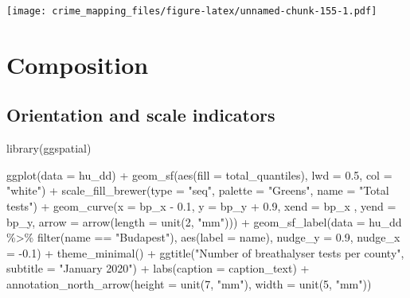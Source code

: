 \documentclass[
]{book}
\newenvironment{Shaded}{\begin{snugshade}}{\end{snugshade}}
\newcommand{\AttributeTok}[1]{\textcolor[rgb]{0.77,0.63,0.00}{#1}}
\newcommand{\DecValTok}[1]{\textcolor[rgb]{0.00,0.00,0.81}{#1}}
\newcommand{\FloatTok}[1]{\textcolor[rgb]{0.00,0.00,0.81}{#1}}
\newcommand{\FunctionTok}[1]{\textcolor[rgb]{0.00,0.00,0.00}{#1}}
\newcommand{\NormalTok}[1]{#1}
\newcommand{\SpecialCharTok}[1]{\textcolor[rgb]{0.00,0.00,0.00}{#1}}
\newcommand{\StringTok}[1]{\textcolor[rgb]{0.31,0.60,0.02}{#1}}
\begin{document}
\texttt{[image: crime\_mapping\_files/figure-latex/unnamed-chunk-155-1.pdf]}

\hypertarget{composition}{%
\section{Composition}\label{composition}}

\hypertarget{orientation-and-scale-indicators}{%
\subsection{Orientation and scale indicators}\label{orientation-and-scale-indicators}}

\begin{Shaded}
\begin{Highlighting}[]
\FunctionTok{library}\NormalTok{(ggspatial)}

\FunctionTok{ggplot}\NormalTok{(}\AttributeTok{data =}\NormalTok{ hu\_dd) }\SpecialCharTok{+} 
  \FunctionTok{geom\_sf}\NormalTok{(}\FunctionTok{aes}\NormalTok{(}\AttributeTok{fill =}\NormalTok{ total\_quantiles), }\AttributeTok{lwd =} \FloatTok{0.5}\NormalTok{, }\AttributeTok{col =} \StringTok{"white"}\NormalTok{) }\SpecialCharTok{+} 
  \FunctionTok{scale\_fill\_brewer}\NormalTok{(}\AttributeTok{type =} \StringTok{"seq"}\NormalTok{, }\AttributeTok{palette =} \StringTok{"Greens"}\NormalTok{, }\AttributeTok{name =} \StringTok{"Total tests"}\NormalTok{) }\SpecialCharTok{+} 
  \FunctionTok{geom\_curve}\NormalTok{(}\AttributeTok{x =}\NormalTok{ bp\_x }\SpecialCharTok{{-}} \FloatTok{0.1}\NormalTok{, }
             \AttributeTok{y =}\NormalTok{ bp\_y }\SpecialCharTok{+} \FloatTok{0.9}\NormalTok{, }
             \AttributeTok{xend =}\NormalTok{ bp\_x , }
             \AttributeTok{yend =}\NormalTok{ bp\_y, }
             \AttributeTok{arrow =} \FunctionTok{arrow}\NormalTok{(}\AttributeTok{length =} \FunctionTok{unit}\NormalTok{(}\DecValTok{2}\NormalTok{, }\StringTok{"mm"}\NormalTok{))) }\SpecialCharTok{+}
  \FunctionTok{geom\_sf\_label}\NormalTok{(}\AttributeTok{data =}\NormalTok{ hu\_dd }\SpecialCharTok{\%\textgreater{}\%} \FunctionTok{filter}\NormalTok{(name }\SpecialCharTok{==} \StringTok{"Budapest"}\NormalTok{), }
                \FunctionTok{aes}\NormalTok{(}\AttributeTok{label =}\NormalTok{ name), }
                \AttributeTok{nudge\_y =} \FloatTok{0.9}\NormalTok{, }
                \AttributeTok{nudge\_x =} \SpecialCharTok{{-}}\FloatTok{0.1}\NormalTok{) }\SpecialCharTok{+} 
  \FunctionTok{theme\_minimal}\NormalTok{() }\SpecialCharTok{+} 
  \FunctionTok{ggtitle}\NormalTok{(}\StringTok{"Number of breathalyser tests per county"}\NormalTok{, }\AttributeTok{subtitle =} \StringTok{"January 2020"}\NormalTok{) }\SpecialCharTok{+} 
  \FunctionTok{labs}\NormalTok{(}\AttributeTok{caption =}\NormalTok{ caption\_text) }\SpecialCharTok{+} 
  \FunctionTok{annotation\_north\_arrow}\NormalTok{(}\AttributeTok{height =} \FunctionTok{unit}\NormalTok{(}\DecValTok{7}\NormalTok{, }\StringTok{"mm"}\NormalTok{), }\AttributeTok{width =} \FunctionTok{unit}\NormalTok{(}\DecValTok{5}\NormalTok{, }\StringTok{"mm"}\NormalTok{)) }
\end{Highlighting}
\end{Shaded}
\end{document}
